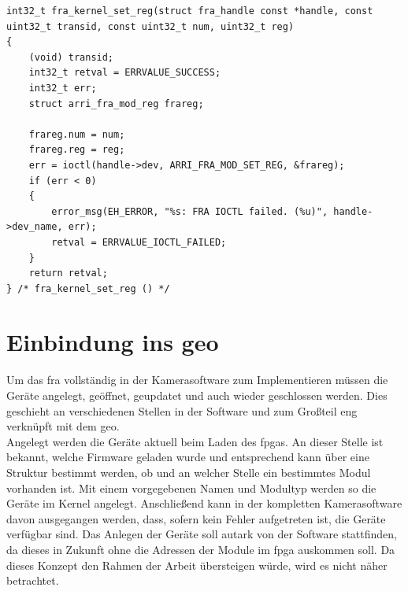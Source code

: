 \begin{lstfloat}
\begin{lstlisting}
int32_t fra_kernel_set_reg(struct fra_handle const *handle, const uint32_t transid, const uint32_t num, uint32_t reg)
{
	(void) transid;
	int32_t retval = ERRVALUE_SUCCESS;
	int32_t err;
	struct arri_fra_mod_reg frareg;
	
	frareg.num = num;
	frareg.reg = reg;
	err = ioctl(handle->dev, ARRI_FRA_MOD_SET_REG, &frareg);
	if (err < 0)
	{
		error_msg(EH_ERROR, "%s: FRA IOCTL failed. (%u)", handle->dev_name, err);
		retval = ERRVALUE_IOCTL_FAILED;
	}  
	return retval;
} /* fra_kernel_set_reg () */
\end{lstlisting}
\end{lstfloat}

\section{Einbindung ins \acl{geo}}\label{sec:soft}
Um das \ac{fra} vollständig in der Kamerasoftware zum Implementieren müssen die Geräte angelegt, geöffnet, geupdatet und auch wieder geschlossen werden. Dies geschieht an verschiedenen Stellen in der Software und zum Großteil eng verknüpft mit dem \ac{geo}.\\


Angelegt werden die Geräte aktuell beim Laden des \ac{fpga}s. An dieser Stelle ist bekannt, welche Firmware geladen wurde und entsprechend kann über eine Struktur bestimmt werden, ob und an welcher Stelle ein bestimmtes Modul vorhanden ist. Mit einem vorgegebenen Namen und Modultyp werden so die Geräte im Kernel angelegt. Anschließend kann in der kompletten Kamerasoftware davon ausgegangen werden, dass, sofern kein Fehler aufgetreten ist, die Geräte verfügbar sind. Das Anlegen der Geräte soll autark von der Software stattfinden, da dieses in Zukunft ohne die Adressen der Module im \ac{fpga} auskommen soll. Da dieses Konzept den Rahmen der Arbeit übersteigen würde, wird es nicht näher betrachtet. \\

